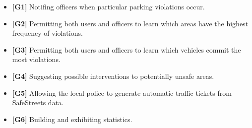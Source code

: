 \begin{itemize}

\item \textbf{[\hypertarget{G1}{G1}]} Notifing officers when particular parking violations occur.

\item \textbf{[\hypertarget{G2}{G2}]} Permitting both users and officers to learn which areas have the highest frequency of violations.

\item \textbf{[\hypertarget{G3}{G3}]} Permitting both users and officers to learn which vehicles commit the most violations.

\item \textbf{[\hypertarget{G4}{G4}]} Suggesting possible interventions to potentially unsafe areas.

\item \textbf{[\hypertarget{G5}{G5}]} Allowing the local police to generate automatic traffic tickets from SafeStreets data.

\item \textbf{[\hypertarget{G6}{G6}]} Building and exhibiting statistics.

\end{itemize}